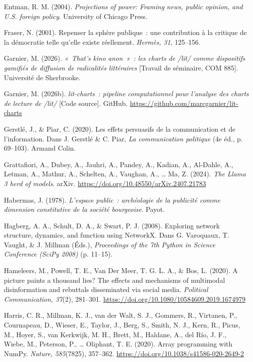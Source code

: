 \documentclass[11pt,a4paper]{article}
\begin{document}
Entman, R. M. (2004). \emph{Projections of power: Framing news, public opinion, and U.S. foreign policy}. University of Chicago Press.

Fraser, N. (2001). Repenser la sphère publique~: une contribution à la critique de la démocratie telle qu'elle existe réellement. \emph{Hermès, 31}, 125--156.

Garnier, M. (2026). \emph{«~That's kino anon~»~: les charts de /lit/ comme dispositifs gamifiés de diffusion de radicalités littéraires} [Travail de séminaire, COM 885]. Université de Sherbrooke.

Garnier, M. (2026b). \emph{lit-charts~: pipeline computationnel pour l'analyse des charts de lecture de /lit/} [Code source]. GitHub. \url{https://github.com/marcgarnier/lit-charts}

Gerstlé, J., \& Piar, C. (2020). Les effets persuasifs de la communication et de l'information. Dans J. Gerstlé \& C. Piar, \emph{La communication politique} (4e éd., p. 69--103). Armand Colin.

Grattafiori, A., Dubey, A., Jauhri, A., Pandey, A., Kadian, A., Al-Dahle, A., Letman, A., Mathur, A., Schelten, A., Vaughan, A., … Ma, Z. (2024). \emph{The Llama 3 herd of models}. arXiv. \url{https://doi.org/10.48550/arXiv.2407.21783}

Habermas, J. (1978). \emph{L'espace public~: archéologie de la publicité comme dimension constitutive de la société bourgeoise}. Payot.

Hagberg, A. A., Schult, D. A., \& Swart, P. J. (2008). Exploring network structure, dynamics, and function using NetworkX. Dans G. Varoquaux, T. Vaught, \& J. Millman (Éds.), \emph{Proceedings of the 7th Python in Science Conference (SciPy 2008)} (p. 11--15).

Hameleers, M., Powell, T. E., Van Der Meer, T. G. L. A., \& Bos, L. (2020). A picture paints a thousand lies? The effects and mechanisms of multimodal disinformation and rebuttals disseminated via social media. \emph{Political Communication, 37}(2), 281--301. \url{https://doi.org/10.1080/10584609.2019.1674979}

Harris, C. R., Millman, K. J., van der Walt, S. J., Gommers, R., Virtanen, P., Cournapeau, D., Wieser, E., Taylor, J., Berg, S., Smith, N. J., Kern, R., Picus, M., Hoyer, S., van Kerkwijk, M. H., Brett, M., Haldane, A., del Río, J. F., Wiebe, M., Peterson, P., … Oliphant, T. E. (2020). Array programming with NumPy. \emph{Nature, 585}(7825), 357--362. \url{https://doi.org/10.1038/s41586-020-2649-2}
\end{document}

